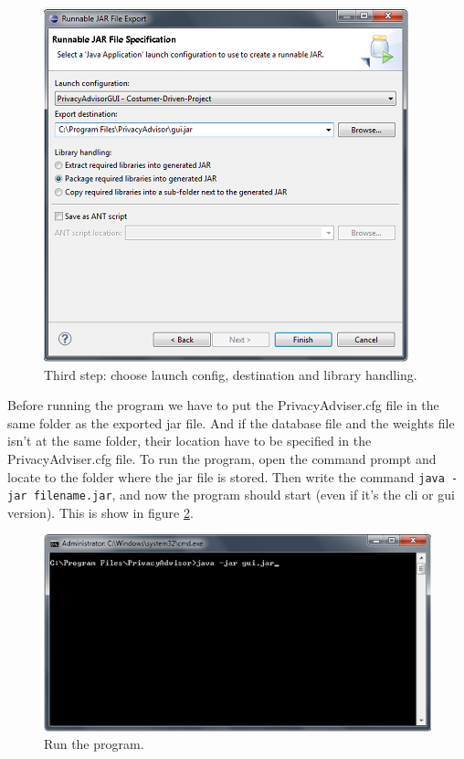 \begin{centering}
  \begin{figure}
    \includegraphics{Documentation/export_last.png}
    \caption{Third step: choose launch config, destination and library handling.}
    \label{exportLastStep}
  \end{figure}
\end{centering}

Before running the program we have to put the PrivacyAdviser.cfg file in the same folder as the exported jar file. And if the database file and the weights file isn't at the same folder, their location have to be specified in the PrivacyAdviser.cfg file. To run the program, open the command prompt and locate to the folder where the jar file is stored. Then write the command \texttt{java -jar filename.jar}, and now the program should start (even if it's the cli or gui version). This is show in figure \ref{runProgram}.


\begin{centering}
  \begin{figure}
    \includegraphics{Documentation/run.png}
    \caption{Run the program.}
    \label{runProgram}
  \end{figure}
\end{centering}

